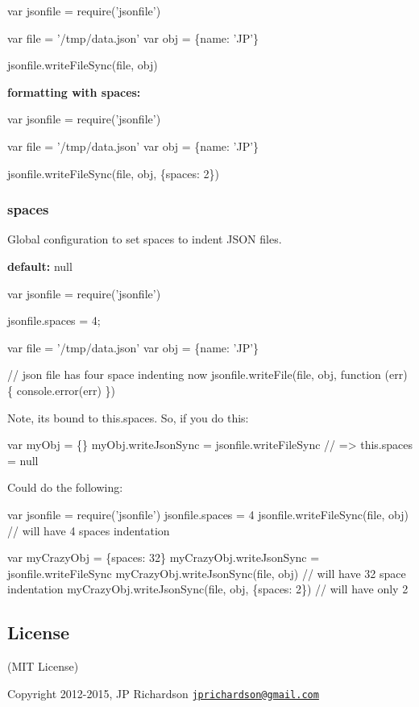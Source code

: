 \begin{DoxyCode}
var jsonfile = require(\textcolor{stringliteral}{'jsonfile'})

var file = '/tmp/data.json'
var obj = \{name: \textcolor{stringliteral}{'JP'}\}

jsonfile.writeFileSync(file, obj)
\end{DoxyCode}


{\bfseries formatting with spaces\+:}


\begin{DoxyCode}
var jsonfile = require(\textcolor{stringliteral}{'jsonfile'})

var file = '/tmp/data.json'
var obj = \{name: \textcolor{stringliteral}{'JP'}\}

jsonfile.writeFileSync(file, obj, \{spaces: 2\})
\end{DoxyCode}


\subsubsection*{spaces}

Global configuration to set spaces to indent J\+S\+O\+N files.

{\bfseries default\+:} {\ttfamily null}


\begin{DoxyCode}
var jsonfile = require(\textcolor{stringliteral}{'jsonfile'})

jsonfile.spaces = 4;

var file = '/tmp/data.json'
var obj = \{name: \textcolor{stringliteral}{'JP'}\}

\textcolor{comment}{// json file has four space indenting now}
jsonfile.writeFile(file, obj, \textcolor{keyword}{function} (err) \{
  console.error(err)
\})
\end{DoxyCode}


Note, it\textquotesingle{}s bound to {\ttfamily this.\+spaces}. So, if you do this\+:


\begin{DoxyCode}
var myObj = \{\}
myObj.writeJsonSync = jsonfile.writeFileSync
\textcolor{comment}{// => this.spaces = null}
\end{DoxyCode}


Could do the following\+:


\begin{DoxyCode}
var jsonfile = require(\textcolor{stringliteral}{'jsonfile'})
jsonfile.spaces = 4
jsonfile.writeFileSync(file, obj) \textcolor{comment}{// will have 4 spaces indentation}

var myCrazyObj = \{spaces: 32\}
myCrazyObj.writeJsonSync = jsonfile.writeFileSync
myCrazyObj.writeJsonSync(file, obj) \textcolor{comment}{// will have 32 space indentation}
myCrazyObj.writeJsonSync(file, obj, \{spaces: 2\}) \textcolor{comment}{// will have only 2}
\end{DoxyCode}


\subsection*{License }

(M\+I\+T License)

Copyright 2012-\/2015, J\+P Richardson \href{mailto:jprichardson@gmail.com}{\tt jprichardson@gmail.\+com} 